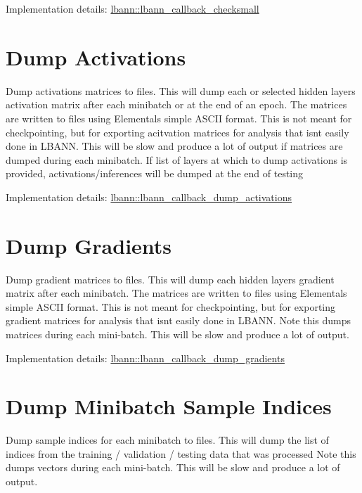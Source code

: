 Implementation details\+: \hyperlink{classlbann_1_1lbann__callback__checksmall}{lbann\+::lbann\+\_\+callback\+\_\+checksmall}\hypertarget{callbacks_dump_acts}{}\section{Dump Activations}\label{callbacks_dump_acts}
Dump activations matrices to files. This will dump each or selected hidden layer\textquotesingle{}s activation matrix after each minibatch or at the end of an epoch. The matrices are written to files using Elemental\textquotesingle{}s simple A\+S\+C\+II format. This is not meant for checkpointing, but for exporting acitvation matrices for analysis that isn\textquotesingle{}t easily done in L\+B\+A\+NN. This will be slow and produce a lot of output if matrices are dumped during each minibatch. If list of layers at which to dump activations is provided, activations/inferences will be dumped at the end of testing

Implementation details\+: \hyperlink{classlbann_1_1lbann__callback__dump__activations}{lbann\+::lbann\+\_\+callback\+\_\+dump\+\_\+activations}\hypertarget{callbacks_dump_grads}{}\section{Dump Gradients}\label{callbacks_dump_grads}
Dump gradient matrices to files. This will dump each hidden layer\textquotesingle{}s gradient matrix after each minibatch. The matrices are written to files using Elemental\textquotesingle{}s simple A\+S\+C\+II format. This is not meant for checkpointing, but for exporting gradient matrices for analysis that isn\textquotesingle{}t easily done in L\+B\+A\+NN. Note this dumps matrices during each mini-\/batch. This will be slow and produce a lot of output.

Implementation details\+: \hyperlink{classlbann_1_1lbann__callback__dump__gradients}{lbann\+::lbann\+\_\+callback\+\_\+dump\+\_\+gradients}\hypertarget{callbacks_dump_mb_sample_indices}{}\section{Dump Minibatch Sample Indices}\label{callbacks_dump_mb_sample_indices}
Dump sample indices for each minibatch to files. This will dump the list of indices from the training / validation / testing data that was processed Note this dumps vectors during each mini-\/batch. This will be slow and produce a lot of output.

